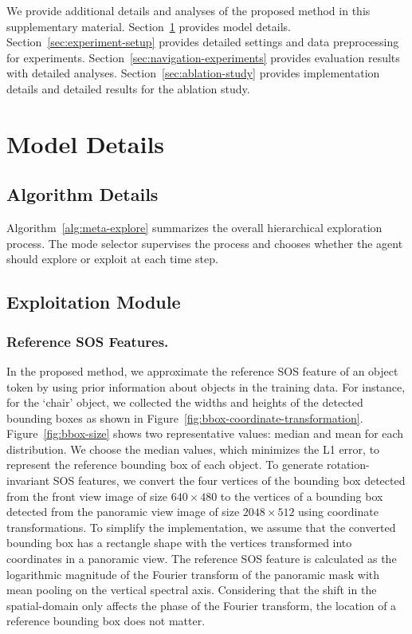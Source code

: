 \documentclass[10pt,twocolumn,letterpaper]{article}
\begin{document}
We provide additional details and analyses of the proposed method in this supplementary material. Section~\ref{sec:model-details} provides model details. Section~\ref{sec:experiment-setup} provides detailed settings and data preprocessing for experiments. Section~\ref{sec:navigation-experiments} provides evaluation results with detailed analyses. Section~\ref{sec:ablation-study} provides implementation details and detailed results for the ablation study.

\section{Model Details}\label{sec:model-details}
\subsection{Algorithm Details}
Algorithm~\ref{alg:meta-explore} summarizes the overall hierarchical exploration process. 
 The mode selector supervises the process and chooses whether the agent should explore or exploit at each time step.

\subsection{Exploitation Module}\label{sec:suppl-exploitation-module}
\subsubsection{Reference SOS Features.}
    In the proposed method, we approximate the reference SOS feature of an object token by using prior information about objects in the training data. For instance, for the `chair' object, we collected the widths and heights of the detected bounding boxes as shown in Figure~\ref{fig:bbox-coordinate-transformation}. Figure~\ref{fig:bbox-size} shows two representative values: median and mean for each distribution. We choose the median values, which minimizes the L1 error, to represent the reference bounding box of each object.
To generate rotation-invariant SOS features, we convert the four vertices of the bounding box detected from the front view image of size $640\times 480$ to the vertices of a bounding box detected from the panoramic view image of size $2048\times512$ using coordinate transformations. To simplify the implementation, we assume that the converted bounding box has a rectangle shape with the vertices transformed into coordinates in a panoramic view. The reference SOS feature is calculated as the logarithmic magnitude of the Fourier transform of the panoramic mask with mean pooling on the vertical spectral axis. Considering that the shift in the spatial-domain only affects the phase of the Fourier transform, the location of a reference bounding box does not matter.
\end{document}
